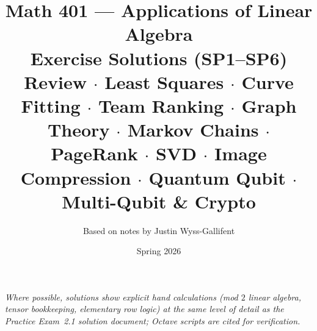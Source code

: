 \documentclass[11pt,a4paper,openany]{book}
\title{\textbf{Math 401 --- Applications of Linear Algebra}\\[0.5em]
\large Exercise Solutions (SP1--SP6)\\[0.3em]
\normalsize Review $\cdot$ Least Squares $\cdot$ Curve Fitting $\cdot$ Team Ranking $\cdot$
Graph Theory $\cdot$ Markov Chains $\cdot$ PageRank $\cdot$ SVD $\cdot$ Image Compression $\cdot$ Quantum Qubit $\cdot$ Multi-Qubit \& Crypto}
\author{Based on notes by Justin Wyss-Gallifent}
\date{Spring 2026}
\begin{document}
\maketitle

\noindent\textit{Where possible, solutions show explicit hand calculations (mod $2$ linear algebra, tensor bookkeeping, elementary row logic) at the same level of detail as the Practice Exam~2.1 solution document; Octave scripts are cited for verification.}

\tableofcontents
\clearpage


\clearpage

\clearpage

\clearpage

\clearpage

\clearpage

\clearpage

\clearpage

\clearpage

\clearpage

\clearpage

\clearpage

\end{document}
